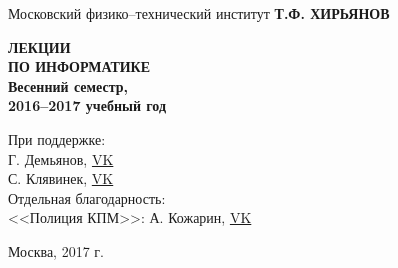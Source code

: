 \begin{titlepage}
	\begin{center}
		{\large Московский физико--технический институт}
		\vfill
		\vfill
		{\Large \textbf{Т.Ф. ХИРЬЯНОВ}}
		\vspace{1.5cm}
		
		
		{\textbf{{\Huge ЛЕКЦИИ\\\smallskip ПО ИНФОРМАТИКЕ}\\ \Large Весенний семестр,\\ 2016--2017 учебный год}}
		\bigskip
	\end{center}
	\vfill
	
	\hfill\begin{minipage}{0.4\textwidth}
		{\centering
				При поддержке:\\
				Г. Демьянов, \href{https://vk.com/id37346992}{VK}\\
				С. Клявинек, \href{https://vk.com/id85132547}{VK}\\
				Отдельная благодарность:\\
				<<Полиция КПМ>>: А. Кожарин, \href{https://vk.com/id92540660}{VK}\\	
			}
	\end{minipage}%

	\vfill
	\begin{center}
		Москва, 2017 г.
	\end{center}
\end{titlepage}